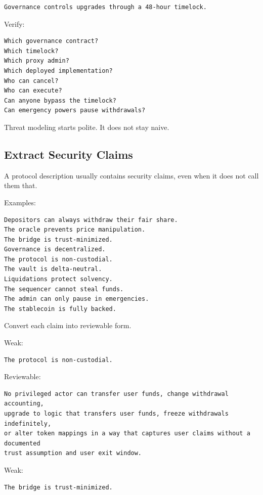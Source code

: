 \begin{lstlisting}
Governance controls upgrades through a 48-hour timelock.
\end{lstlisting}

Verify:

\begin{lstlisting}
Which governance contract?
Which timelock?
Which proxy admin?
Which deployed implementation?
Who can cancel?
Who can execute?
Can anyone bypass the timelock?
Can emergency powers pause withdrawals?
\end{lstlisting}

Threat modeling starts polite. It does not stay naive.

\subsection{Extract Security Claims}

A protocol description usually contains security claims, even when it
does not call them that.

Examples:

\begin{lstlisting}
Depositors can always withdraw their fair share.
The oracle prevents price manipulation.
The bridge is trust-minimized.
Governance is decentralized.
The protocol is non-custodial.
The vault is delta-neutral.
Liquidations protect solvency.
The sequencer cannot steal funds.
The admin can only pause in emergencies.
The stablecoin is fully backed.
\end{lstlisting}

Convert each claim into reviewable form.

Weak:

\begin{lstlisting}
The protocol is non-custodial.
\end{lstlisting}

Reviewable:

\begin{lstlisting}
No privileged actor can transfer user funds, change withdrawal accounting,
upgrade to logic that transfers user funds, freeze withdrawals indefinitely,
or alter token mappings in a way that captures user claims without a documented
trust assumption and user exit window.
\end{lstlisting}

Weak:

\begin{lstlisting}
The bridge is trust-minimized.
\end{lstlisting}

